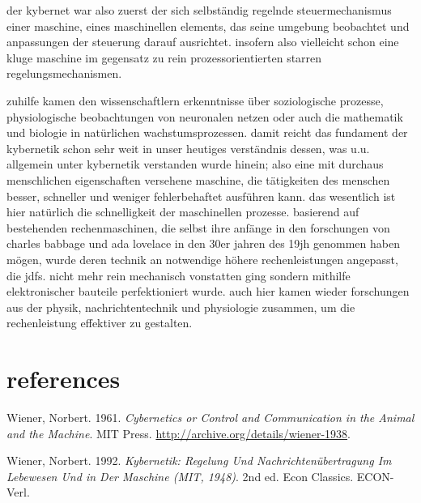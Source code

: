 \documentclass[
  letterpaper,
  DIV=11,
  numbers=noendperiod]{scrartcl}
\newlength{\cslhangindent}
\newenvironment{CSLReferences}[2] %
 {\begin{list}{}{%
  \setlength{\itemindent}{0pt}
  \setlength{\leftmargin}{0pt}
  \setlength{\parsep}{0pt}
  \ifodd #1
   \setlength{\leftmargin}{\cslhangindent}
   \setlength{\itemindent}{-1\cslhangindent}
  \fi
  \setlength{\itemsep}{#2\baselineskip}}}
 {\end{list}}
\begin{document}
der kybernet war also zuerst der sich selbständig regelnde
steuermechanismus einer maschine, eines maschinellen elements, das seine
umgebung beobachtet und anpassungen der steuerung darauf ausrichtet.
insofern also vielleicht schon eine kluge maschine im gegensatz zu rein
prozessorientierten starren regelungsmechanismen.

zuhilfe kamen den wissenschaftlern erkenntnisse über soziologische
prozesse, physiologische beobachtungen von neuronalen netzen oder auch
die mathematik und biologie in natürlichen wachstumsprozessen. damit
reicht das fundament der kybernetik schon sehr weit in unser heutiges
verständnis dessen, was u.u. allgemein unter kybernetik verstanden wurde
hinein; also eine mit durchaus menschlichen eigenschaften versehene
maschine, die tätigkeiten des menschen besser, schneller und weniger
fehlerbehaftet ausführen kann. das wesentlich ist hier natürlich die
schnelligkeit der maschinellen prozesse. basierend auf bestehenden
rechenmaschinen, die selbst ihre anfänge in den forschungen von charles
babbage und ada lovelace in den 30er jahren des 19jh genommen haben
mögen, wurde deren technik an notwendige höhere rechenleistungen
angepasst, die jdfs. nicht mehr rein mechanisch vonstatten ging sondern
mithilfe elektronischer bauteile perfektioniert wurde. auch hier kamen
wieder forschungen aus der physik, nachrichtentechnik und physiologie
zusammen, um die rechenleistung effektiver zu gestalten.

\section*{references}\label{references}

\protect{}\label{refs}
\begin{CSLReferences}{1}{1}
Wiener, Norbert. 1961. \emph{Cybernetics or {Control} and
{Communication} in the {Animal} and the {Machine}}. MIT Press.
\url{http://archive.org/details/wiener-1938}.

Wiener, Norbert. 1992. \emph{Kybernetik: {Regelung} Und
{Nachrichtenübertragung} Im {Lebewesen} Und in Der {Maschine} ({MIT},
1948)}. 2nd ed. Econ Classics. ECON-Verl.

\end{CSLReferences}
\end{document}
